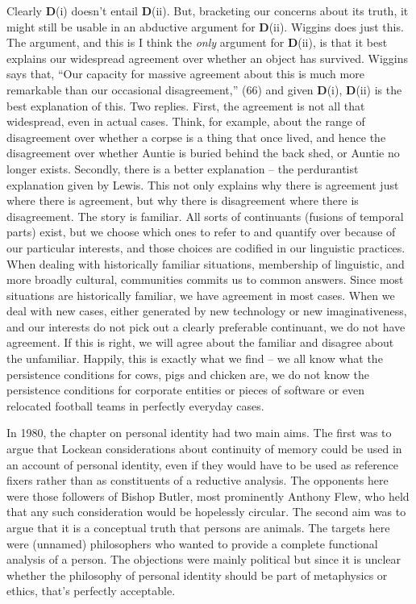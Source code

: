 \documentclass[
  10pt,
  letterpaper,
  DIV=11,
  numbers=noendperiod,
  twoside]{scrartcl}
\begin{document}
Clearly \textbf{D}(i) doesn't entail \textbf{D}(ii). But, bracketing our
concerns about its truth, it might still be usable in an abductive
argument for \textbf{D}(ii). Wiggins does just this. The argument, and
this is I think the \emph{only} argument for \textbf{D}(ii), is that it
best explains our widespread agreement over whether an object has
survived. Wiggins says that, ``Our capacity for massive agreement about
this is much more remarkable than our occasional disagreement,'' (66)
and given \textbf{D}(i), \textbf{D}(ii) is the best explanation of this.
Two replies. First, the agreement is not all that widespread, even in
actual cases. Think, for example, about the range of disagreement over
whether a corpse is a thing that once lived, and hence the disagreement
over whether Auntie is buried behind the back shed, or Auntie no longer
exists. Secondly, there is a better explanation -- the perdurantist
explanation given by Lewis. This not only explains why there is
agreement just where there is agreement, but why there is disagreement
where there is disagreement. The story is familiar. All sorts of
continuants (fusions of temporal parts) exist, but we choose which ones
to refer to and quantify over because of our particular interests, and
those choices are codified in our linguistic practices. When dealing
with historically familiar situations, membership of linguistic, and
more broadly cultural, communities commits us to common answers. Since
most situations are historically familiar, we have agreement in most
cases. When we deal with new cases, either generated by new technology
or new imaginativeness, and our interests do not pick out a clearly
preferable continuant, we do not have agreement. If this is right, we
will agree about the familiar and disagree about the unfamiliar.
Happily, this is exactly what we find -- we all know what the
persistence conditions for cows, pigs and chicken are, we do not know
the persistence conditions for corporate entities or pieces of software
or even relocated football teams in perfectly everyday cases.

In 1980, the chapter on personal identity had two main aims. The first
was to argue that Lockean considerations about continuity of memory
could be used in an account of personal identity, even if they would
have to be used as reference fixers rather than as constituents of a
reductive analysis. The opponents here were those followers of Bishop
Butler, most prominently Anthony Flew, who held that any such
consideration would be hopelessly circular. The second aim was to argue
that it is a conceptual truth that persons are animals. The targets here
were (unnamed) philosophers who wanted to provide a complete functional
analysis of a person. The objections were mainly political but since it
is unclear whether the philosophy of personal identity should be part of
metaphysics or ethics, that's perfectly acceptable.
\end{document}
